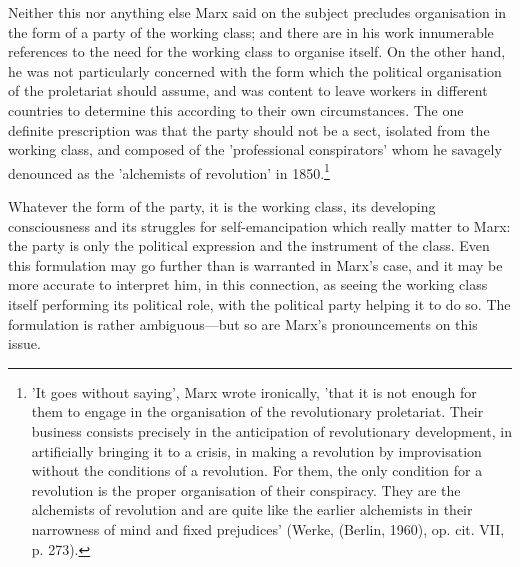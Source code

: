 Neither this nor anything else Marx said on the subject precludes organisation in the form of a party of the working class; and there are in his work innumerable references to the need for the working class to organise itself. On the other hand, he was not particularly concerned with the form which the political organisation of the proletariat should assume, and was content to leave workers in different countries to determine this according to their own circumstances. The one definite prescription was that the party should not be a sect, isolated from the working class, and composed of the 'professional conspirators' whom he savagely denounced as the 'alchemists of revolution' in 1850.\footnote{'It goes without saying', Marx wrote ironically, 'that it is not enough for them to engage in the organisation of the revolutionary proletariat. Their business consists precisely in the anticipation of revolutionary development, in artificially bringing it to a crisis, in making a revolution by improvisation without the conditions of a revolution. For them, the only condition for a revolution is the proper organisation of their conspiracy. They are the alchemists of revolution and are quite like the earlier alchemists in their narrowness of mind and fixed prejudices' (Werke, (Berlin, 1960), op. cit. VII, p. 273).}

Whatever the form of the party, it is the working class, its developing consciousness and its struggles for self-emancipation which really matter to Marx: the party is only the political expression and the instrument of the class. Even this formulation may go further than is warranted in Marx's case, and it may be more accurate to interpret him, in this connection, as seeing the working class itself performing its political role, with the political party helping it to do so. The formulation is rather ambiguous—but so are Marx's pronouncements on this issue.

